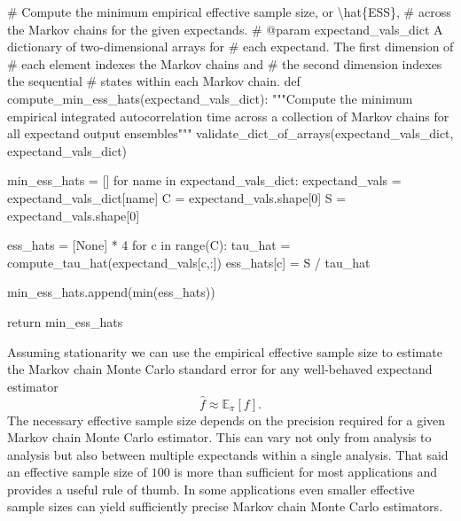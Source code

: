 \documentclass[
  letterpaper,
  DIV=11,
  numbers=noendperiod]{scrartcl}
\newenvironment{Shaded}{\begin{snugshade}}{\end{snugshade}}
\newcommand{\BuiltInTok}[1]{\textcolor[rgb]{0.00,0.23,0.31}{#1}}
\newcommand{\CommentTok}[1]{\textcolor[rgb]{0.37,0.37,0.37}{#1}}
\newcommand{\ControlFlowTok}[1]{\textcolor[rgb]{0.00,0.23,0.31}{#1}}
\newcommand{\DecValTok}[1]{\textcolor[rgb]{0.68,0.00,0.00}{#1}}
\newcommand{\KeywordTok}[1]{\textcolor[rgb]{0.00,0.23,0.31}{#1}}
\newcommand{\NormalTok}[1]{\textcolor[rgb]{0.00,0.23,0.31}{#1}}
\newcommand{\OperatorTok}[1]{\textcolor[rgb]{0.37,0.37,0.37}{#1}}
\newcommand{\StringTok}[1]{\textcolor[rgb]{0.13,0.47,0.30}{#1}}
\newcommand{\VariableTok}[1]{\textcolor[rgb]{0.07,0.07,0.07}{#1}}
\begin{document}
\begin{Shaded}
\begin{Highlighting}[]
\CommentTok{\# Compute the minimum empirical effective sample size, or \textbackslash{}hat\{ESS\},}
\CommentTok{\# across the Markov chains for the given expectands.}
\CommentTok{\# @param expectand\_vals\_dict A dictionary of two{-}dimensional arrays for}
\CommentTok{\#                            each expectand.  The first dimension of}
\CommentTok{\#                            each element indexes the Markov chains and}
\CommentTok{\#                            the second dimension indexes the sequential}
\CommentTok{\#                            states within each Markov chain.}
\KeywordTok{def}\NormalTok{ compute\_min\_ess\_hats(expectand\_vals\_dict):}
  \CommentTok{"""Compute the minimum empirical integrated autocorrelation time}
\CommentTok{     across a collection of Markov chains for all expectand output}
\CommentTok{     ensembles"""}
\NormalTok{  validate\_dict\_of\_arrays(expectand\_vals\_dict, }\StringTok{\textquotesingle{}expectand\_vals\_dict\textquotesingle{}}\NormalTok{)}

\NormalTok{  min\_ess\_hats }\OperatorTok{=}\NormalTok{ []}
  \ControlFlowTok{for}\NormalTok{ name }\KeywordTok{in}\NormalTok{ expectand\_vals\_dict:}
\NormalTok{    expectand\_vals }\OperatorTok{=}\NormalTok{ expectand\_vals\_dict[name]}
\NormalTok{    C }\OperatorTok{=}\NormalTok{ expectand\_vals.shape[}\DecValTok{0}\NormalTok{]}
\NormalTok{    S }\OperatorTok{=}\NormalTok{ expectand\_vals.shape[}\DecValTok{0}\NormalTok{]}

\NormalTok{    ess\_hats }\OperatorTok{=}\NormalTok{ [}\VariableTok{None}\NormalTok{] }\OperatorTok{*} \DecValTok{4}
    \ControlFlowTok{for}\NormalTok{ c }\KeywordTok{in} \BuiltInTok{range}\NormalTok{(C):}
\NormalTok{      tau\_hat }\OperatorTok{=}\NormalTok{ compute\_tau\_hat(expectand\_vals[c,:])}
\NormalTok{      ess\_hats[c] }\OperatorTok{=}\NormalTok{ S }\OperatorTok{/}\NormalTok{ tau\_hat}

\NormalTok{    min\_ess\_hats.append(}\BuiltInTok{min}\NormalTok{(ess\_hats))}

  \ControlFlowTok{return}\NormalTok{ min\_ess\_hats}
\end{Highlighting}
\end{Shaded}

Assuming stationarity we can use the empirical effective sample size to
estimate the Markov chain Monte Carlo standard error for any
well-behaved expectand estimator \[
\hat{f} \approx \mathbb{E}_{\pi}[f].
\] The necessary effective sample size depends on the precision required
for a given Markov chain Monte Carlo estimator. This can vary not only
from analysis to analysis but also between multiple expectands within a
single analysis. That said an effective sample size of \(100\) is more
than sufficient for most applications and provides a useful rule of
thumb. In some applications even smaller effective sample sizes can
yield sufficiently precise Markov chain Monte Carlo estimators.
\end{document}
